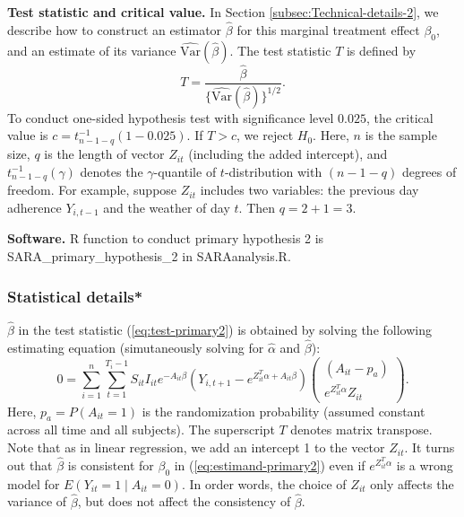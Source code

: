 \documentclass[11pt]{article}
\begin{document}
\textbf{Test statistic and critical value.} In Section \ref{subsec:Technical-details-2},
we describe how to construct an estimator $\hat{\beta}$ for this
marginal treatment effect $\beta_{0}$, and an estimate of its variance
$\widehat{\text{Var}}(\hat{\beta})$. The test statistic $T$ is defined
by
\begin{equation}
T=\frac{\hat{\beta}}{\{\widehat{\text{Var}}(\hat{\beta})\}^{1/2}}.\label{eq:test-primary2}
\end{equation}
To conduct one-sided hypothesis test with significance level $0.025$,
the critical value is $c=t_{n-1-q}^{-1}(1-0.025)$. If $T>c$, we
reject $H_{0}$. Here, $n$ is the sample size, $q$ is the length
of vector $Z_{it}$ (including the added intercept), and $t_{n-1-q}^{-1}(\gamma)$
denotes the $\gamma$-quantile of $t$-distribution with $(n-1-q)$
degrees of freedom. For example, suppose $Z_{it}$ includes two variables:
the previous day adherence $Y_{i,t-1}$ and the weather of day $t$.
Then $q=2+1=3$.

\textbf{Software.} R function to conduct primary hypothesis 2 is
\textsf{SARA\_primary\_hypothesis\_2} in \textsf{SARAanalysis.R}.

\subsubsection{Statistical details{*} \label{subsec:Technical-details-2}}

$\hat{\beta}$ in the test statistic (\ref{eq:test-primary2}) is
obtained by solving the following estimating equation (simutaneously
solving for $\hat{\alpha}$ and $\hat{\beta}$):
\begin{equation}
0=\sum_{i=1}^{n}\sum_{t=1}^{T_i - 1}S_{it} I_{it}e^{-A_{it}\beta}\left(Y_{i,t+1}-e^{Z_{it}^{T}\alpha+A_{it}\beta}\right)\begin{pmatrix}(A_{it}-p_{a})\\
e^{Z_{it}^{T}\alpha}Z_{it}
\end{pmatrix}.\label{eq:ee-primary2}
\end{equation}
Here, $p_{a}=P(A_{it}=1)$ is the randomization probability (assumed
constant across all time and all subjects). The superscript $T$ denotes
matrix transpose. Note that as in linear regression, we add an intercept
1 to the vector $Z_{it}$. It turns out that $\hat{\beta}$ is consistent
for $\beta_{0}$ in (\ref{eq:estimand-primary2}) even if $e^{Z_{it}^{T}\alpha}$
is a wrong model for $E(Y_{it}=1\mid A_{it}=0)$. In order words,
the choice of $Z_{it}$ only affects the variance of $\hat{\beta}$,
but does not affect the consistency of $\hat{\beta}$.
\end{document}
